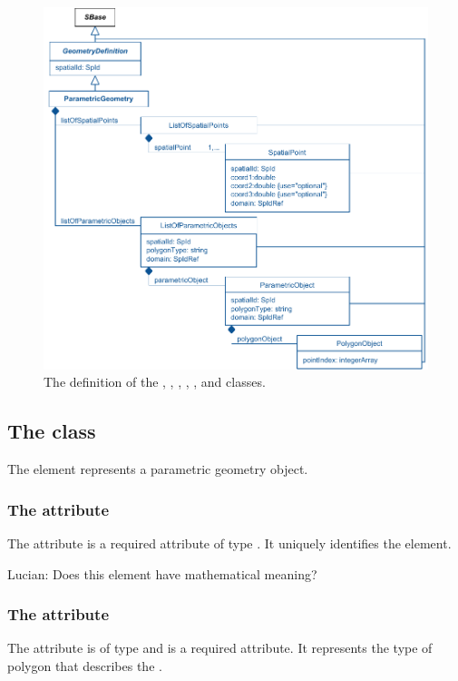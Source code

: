 \begin{figure}[ht]
  \includegraphics{figs/ParametricGeometry-uml}
  \caption{The definition of the \ParametricGeometry, \ListOfSpatialPoints, \SpatialPoint, \ListOfParametricObjects, \ParametricObject, and \PolygonObject classes.}
  \label{ParametricGeometry-uml}
  \label{ListOfSpatialPoints-uml}
  \label{SpatialPoint-uml}
  \label{ListOfParametricObjects-uml}
  \label{ParametricObject-uml}
  \label{PolygonObject-uml}
\end{figure}


\subsection{The  class}
\label{ParametricObject-class}
The \ParametricObject element represents a parametric geometry object. 

\subsubsection{The  attribute}
The  attribute is a required attribute of type . It uniquely identifies the \ParametricObject element.

{\color{red} Lucian: \notice Does this element have mathematical meaning?}

\subsubsection{The  attribute}
The  attribute is of type  and is a required attribute. It represents the type of polygon that describes the \ParametricObject.

